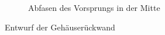 \begin{figure}[H]
\begin{subfigure}[t]{.3\linewidth}
		\caption[Abfasen des Vorsprungs in der Mitte]{Abfasen des Vorsprungs in der Mitte}
		\label{fig:design-back-15}
	\end{subfigure}
	\caption[Entwurf der Gehäuserückwand]{Entwurf der Gehäuserückwand}
	\label{fig:design-back}
\end{figure}\par
\newpage